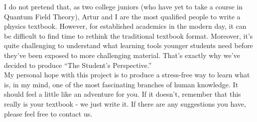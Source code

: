 \documentclass[paper=letterpaper, fontsize=11pt]{article} %
\numberwithin{equation}{section} %
\numberwithin{figure}{section} %
\numberwithin{table}{section} %
\begin{document}
I do not pretend that, as two college juniors (who have yet to take a course in Quantum Field Theory), Artur and I are the most qualified people to write a physics textbook. However, for established academics in the modern day, it can be difficult to find time to rethink the traditional textbook format. Moreover, it's quite challenging to understand what learning tools younger students need before they've been exposed to more challenging material. That's exactly why we've decided to produce ``The Student's Perspective.''\\

My personal hope with this project is to produce a stress-free way to learn what is, in my mind, one of the most fascinating branches of human knowledge. It should feel a little like an adventure for you. If it doesn't, remember that this really is your textbook - we just write it. If there are any suggestions you have, please feel free to contact us.
\end{document}
